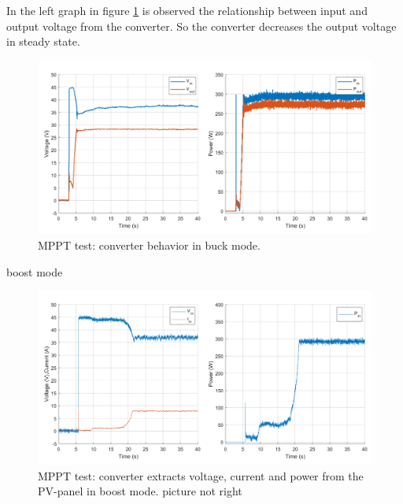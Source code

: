 In the left graph in figure \ref{MPPTtestbuckmode2} is observed the relationship between input and output voltage from the converter. So the converter decreases the output voltage in steady state.
 
\begin{figure}[H]
	\begin{center}
		\includegraphics[width=1\textwidth]{../Pictures/P1/Test/Buck_mode_MPPT_Vin_Vout_Pin_Pout}
		\caption{MPPT test: converter behavior in buck mode.}
		\label{MPPTtestbuckmode2}
	\end{center}	
\end{figure}



boost mode

\begin{figure}[H]
	\begin{center}
		\includegraphics[width=1\textwidth]{../Pictures/P1/Test/Boost_mode_MPPT_Vin_Iin_Pin}
		\caption{MPPT test: converter extracts voltage, current and power from the PV-panel in boost mode. picture not right}
		\label{MPPTtestboostmode1}
	\end{center}	
\end{figure}

